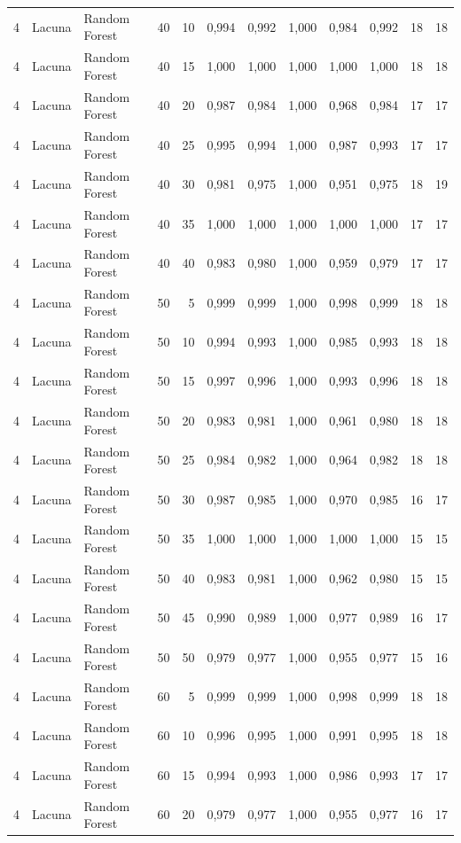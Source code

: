 \begin{longtable}{@{}rllrrrrrrrrr@{}}
4 & Lacuna & Random Forest & 40 & 10 & 0,994 & 0,992 & 1,000 & 0,984 & 0,992 & 18 & 18 \\
4 & Lacuna & Random Forest & 40 & 15 & 1,000 & 1,000 & 1,000 & 1,000 & 1,000 & 18 & 18 \\
4 & Lacuna & Random Forest & 40 & 20 & 0,987 & 0,984 & 1,000 & 0,968 & 0,984 & 17 & 17 \\
4 & Lacuna & Random Forest & 40 & 25 & 0,995 & 0,994 & 1,000 & 0,987 & 0,993 & 17 & 17 \\
4 & Lacuna & Random Forest & 40 & 30 & 0,981 & 0,975 & 1,000 & 0,951 & 0,975 & 18 & 19 \\
4 & Lacuna & Random Forest & 40 & 35 & 1,000 & 1,000 & 1,000 & 1,000 & 1,000 & 17 & 17 \\
4 & Lacuna & Random Forest & 40 & 40 & 0,983 & 0,980 & 1,000 & 0,959 & 0,979 & 17 & 17 \\
4 & Lacuna & Random Forest & 50 & 5 & 0,999 & 0,999 & 1,000 & 0,998 & 0,999 & 18 & 18 \\
4 & Lacuna & Random Forest & 50 & 10 & 0,994 & 0,993 & 1,000 & 0,985 & 0,993 & 18 & 18 \\
4 & Lacuna & Random Forest & 50 & 15 & 0,997 & 0,996 & 1,000 & 0,993 & 0,996 & 18 & 18 \\
4 & Lacuna & Random Forest & 50 & 20 & 0,983 & 0,981 & 1,000 & 0,961 & 0,980 & 18 & 18 \\
4 & Lacuna & Random Forest & 50 & 25 & 0,984 & 0,982 & 1,000 & 0,964 & 0,982 & 18 & 18 \\
4 & Lacuna & Random Forest & 50 & 30 & 0,987 & 0,985 & 1,000 & 0,970 & 0,985 & 16 & 17 \\
4 & Lacuna & Random Forest & 50 & 35 & 1,000 & 1,000 & 1,000 & 1,000 & 1,000 & 15 & 15 \\
4 & Lacuna & Random Forest & 50 & 40 & 0,983 & 0,981 & 1,000 & 0,962 & 0,980 & 15 & 15 \\
4 & Lacuna & Random Forest & 50 & 45 & 0,990 & 0,989 & 1,000 & 0,977 & 0,989 & 16 & 17 \\
4 & Lacuna & Random Forest & 50 & 50 & 0,979 & 0,977 & 1,000 & 0,955 & 0,977 & 15 & 16 \\
4 & Lacuna & Random Forest & 60 & 5 & 0,999 & 0,999 & 1,000 & 0,998 & 0,999 & 18 & 18 \\
4 & Lacuna & Random Forest & 60 & 10 & 0,996 & 0,995 & 1,000 & 0,991 & 0,995 & 18 & 18 \\
4 & Lacuna & Random Forest & 60 & 15 & 0,994 & 0,993 & 1,000 & 0,986 & 0,993 & 17 & 17 \\
4 & Lacuna & Random Forest & 60 & 20 & 0,979 & 0,977 & 1,000 & 0,955 & 0,977 & 16 & 17 \\

\end{longtable}
